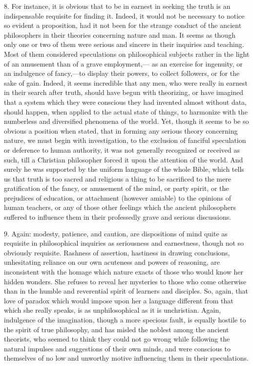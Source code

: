 8. For instance, it is obvious that to be in earnest in seeking the
truth is an indispensable requisite for finding it. Indeed, it would
not be necessary to notice so evident a proposition, had it not been
for the strange conduct of the ancient philosophers in their theories
concerning nature and man. It seems as though only one or two of them
were serious and sincere in their inquiries and teaching. Most of them
considered speculations on philosophical subjects rather in the light
of an amusement than of a grave employment,— as an exercise for
ingenuity, or an indulgence of fancy,—to display their powers, to
collect followers, or for the sake of gain. Indeed, it seems
incredible that any men, who were really in earnest in their search
after truth, should have begun with theorizing, or have imagined that
a system which they were conscious they had invented almost without
data, should happen, when applied to the actual state of things, to
harmonize with the numberless and diversified phenomena of the world.
Yet, though it seems to be so obvious a position when stated, that in
forming any serious theory concerning nature, we must begin with
investigation, to the exclusion of fanciful speculation or deference
to human authority, it was not generally recognized or received as
such, till a Christian philosopher forced it upon the attention of the
world. And surely he was supported by the uniform language of the
whole Bible, which tells us that truth is too sacred and religious a
thing to be sacrificed to the mere gratification of the fancy, or
amusement of the mind, or party spirit, or the prejudices of
education, or attachment (however amiable) to the opinions of human
teachers, or any of those other feelings which the ancient
philosophers suffered to influence them in their professedly grave and
serious discussions.

9. Again: modesty, patience, and caution, are dispositions of mind
quite as requisite in philosophical inquiries as seriousness and
earnestness, though not so obviously requisite. Rashness of assertion,
hastiness in drawing conclusions, unhesitating reliance on our own
acuteness and powers of reasoning, are inconsistent with the homage
which nature exacts of those who would know her hidden wonders. She
refuses to reveal her mysteries to those who come otherwise than in
the humble and reverential spirit of learners and disciples. So,
again, that love of paradox which would impose upon her a language
different from that which she really speaks, is as unphilosophical as
it is unchristian. Again, indulgence of the imagination, though a more
specious fault, is equally hostile to the spirit of true philosophy,
and has misled the noblest among the ancient theorists, who seemed to
think they could not go wrong while following the natural impulses and
suggestions of their own minds, and were conscious to themselves of no
low and unworthy motive influencing them in their speculations.

